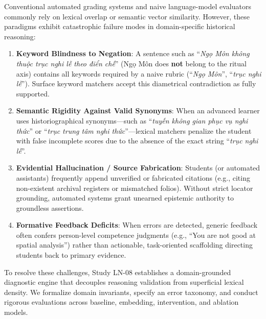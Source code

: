\documentclass[11pt,a4paper]{article}
\begin{document}
Conventional automated grading systems and naive language-model evaluators commonly rely on lexical overlap or semantic vector similarity. However, these paradigms exhibit catastrophic failure modes in domain-specific historical reasoning:
\begin{enumerate}[leftmargin=*]
    \item \textbf{Keyword Blindness to Negation}: A sentence such as ``\textit{Ngọ Môn không thuộc trục nghi lễ theo điển chế}'' (Ngọ Môn does \textbf{not} belong to the ritual axis) contains all keywords required by a naive rubric (``\textit{Ngọ Môn}'', ``\textit{trục nghi lễ}''). Surface keyword matchers accept this diametrical contradiction as fully supported.
    \item \textbf{Semantic Rigidity Against Valid Synonyms}: When an advanced learner uses historiographical synonyms—such as ``\textit{tuyến không gian phục vụ nghi thức}'' or ``\textit{trục trung tâm nghi thức}''—lexical matchers penalize the student with false incomplete scores due to the absence of the exact string ``\textit{trục nghi lễ}''.
    \item \textbf{Evidential Hallucination / Source Fabrication}: Students (or automated assistants) frequently append unverified or fabricated citations (e.g., citing non-existent archival registers or mismatched folios). Without strict locator grounding, automated systems grant unearned epistemic authority to groundless assertions.
    \item \textbf{Formative Feedback Deficits}: When errors are detected, generic feedback often confers person-level competence judgments (e.g., ``You are not good at spatial analysis'') rather than actionable, task-oriented scaffolding directing students back to primary evidence.
\end{enumerate}

To resolve these challenges, Study LN-08 establishes a domain-grounded diagnostic engine that decouples reasoning validation from superficial lexical density. We formalize domain invariants, specify an error taxonomy, and conduct rigorous evaluations across baseline, embedding, intervention, and ablation models.
\end{document}
